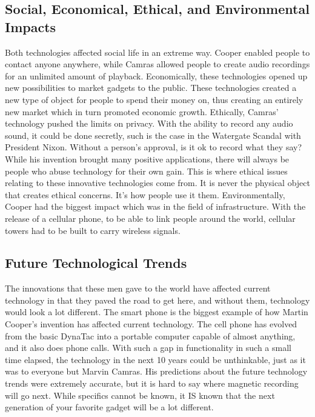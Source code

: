\documentclass[12pt,letter]{article}
\begin{document}
\subsection{Social, Economical, Ethical, and Environmental Impacts}
Both technologies affected social life in an extreme way. Cooper enabled people to contact anyone anywhere, while Camras allowed people to create audio recordings for an unlimited amount of playback. Economically, these technologies opened up new possibilities to market gadgets to the public. These technologies created a new type of object for people to spend their money on, thus creating an entirely new market which in turn promoted economic growth. Ethically, Camras' technology pushed the limits on privacy. With the ability to record any audio sound, it could be done secretly, such is the case in the Watergate Scandal with President Nixon. Without a person's approval, is it ok to record what they say? While his invention brought many positive applications, there will always be people who abuse technology for their own gain. This is where ethical issues relating to these innovative technologies come from. It is never the physical object that creates ethical concerns. It's how people use it them. Environmentally, Cooper had the biggest impact which was in the field of infrastructure. With the release of a cellular phone, to be able to link people around the world, cellular towers had to be built to carry wireless signals.
\subsection{Future Technological Trends}
The innovations that these men gave to the world have affected current technology in that they paved the road to get here, and without them, technology would look a lot different.  The smart phone is the biggest example of how Martin Cooper's invention has affected current technology. The cell phone has evolved from the basic DynaTac into a portable computer capable of almost anything, and it also does phone calls. With such a gap in functionality in such a small time elapsed, the technology in the next 10 years could be unthinkable, just as it was to everyone but Marvin Camras. His predictions about the future technology trends were extremely accurate, but it is hard to say where magnetic recording will go next. While specifics cannot be known, it IS known that the next generation of your favorite gadget will be a lot different.
\end{document}
